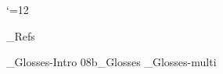 



 \catcode`\@=12













_Refs
%
%
\bye



%
%
%


\bye
_Glosses-Intro
\get 08b_Glosses
_Glosses-multi

